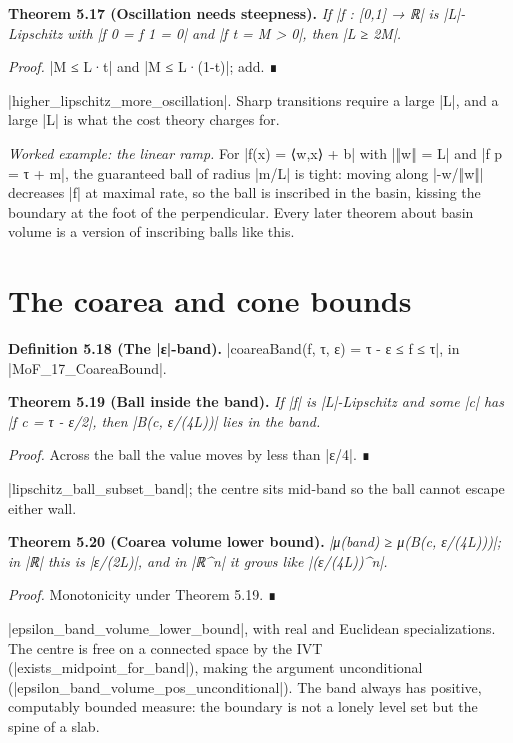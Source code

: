 \documentclass{memoir}
\begin{document}
\textbf{Theorem 5.17 (Oscillation needs steepness).} \emph{If \LeanVerb|f : [0,1] → ℝ| is \LeanVerb|L|-Lipschitz with
\LeanVerb|f 0 = f 1 = 0| and \LeanVerb|f t = M > 0|, then \LeanVerb|L ≥ 2M|.}

\emph{Proof.} \LeanVerb|M ≤ L·t| and \LeanVerb|M ≤ L·(1-t)|; add. ∎

\LeanVerb|higher_lipschitz_more_oscillation|. Sharp transitions require a large \LeanVerb|L|, and
a large \LeanVerb|L| is what the cost theory charges for.

\emph{Worked example: the linear ramp.} For \LeanVerb|f(x) = ⟨w,x⟩ + b| with \LeanVerb|‖w‖ = L| and \LeanVerb|f p = τ + m|,
the guaranteed ball of radius \LeanVerb|m/L| is tight: moving along \LeanVerb|-w/‖w‖| decreases
\LeanVerb|f| at maximal rate, so the ball is inscribed in the basin, kissing the boundary
at the foot of the perpendicular. Every later theorem about basin volume is a
version of inscribing balls like this.



\section{The coarea and cone bounds}\label{Two--Schemas--of--Impossibility-005F-005F-005F--Machine--Checked--Limits--of--Trustworthy--Machine--Learning-005F-005F-005F--and--Why--They--Tighten--with--Capability----The--Geometry--of--Attacks----The--coarea--and--cone--bounds}

\textbf{Definition 5.18 (The \LeanVerb|ε|-band).} \LeanVerb|coareaBand(f, τ, ε) = τ - ε ≤ f ≤ τ|, in
\LeanVerb|MoF_17_CoareaBound|.

\textbf{Theorem 5.19 (Ball inside the band).} \emph{If \LeanVerb|f| is \LeanVerb|L|-Lipschitz and some \LeanVerb|c| has
\LeanVerb|f c = τ - ε/2|, then \LeanVerb|B(c, ε/(4L))| lies in the band.}

\emph{Proof.} Across the ball the value moves by less than \LeanVerb|ε/4|. ∎

\LeanVerb|lipschitz_ball_subset_band|; the centre sits mid-band so the ball cannot escape
either wall.

\textbf{Theorem 5.20 (Coarea volume lower bound).} \emph{\LeanVerb|μ(band) ≥ μ(B(c, ε/(4L)))|; in \LeanVerb|ℝ| this is
\LeanVerb|ε/(2L)|, and in \LeanVerb|ℝ^n| it grows like \LeanVerb|(ε/(4L))^n|.}

\emph{Proof.} Monotonicity under Theorem 5.19. ∎

\LeanVerb|epsilon_band_volume_lower_bound|, with real and Euclidean specializations. The
centre is free on a connected space by the IVT (\LeanVerb|exists_midpoint_for_band|),
making the argument unconditional (\LeanVerb|epsilon_band_volume_pos_unconditional|). The
band always has positive, computably bounded measure: the boundary is not a
lonely level set but the spine of a slab.
\end{document}

